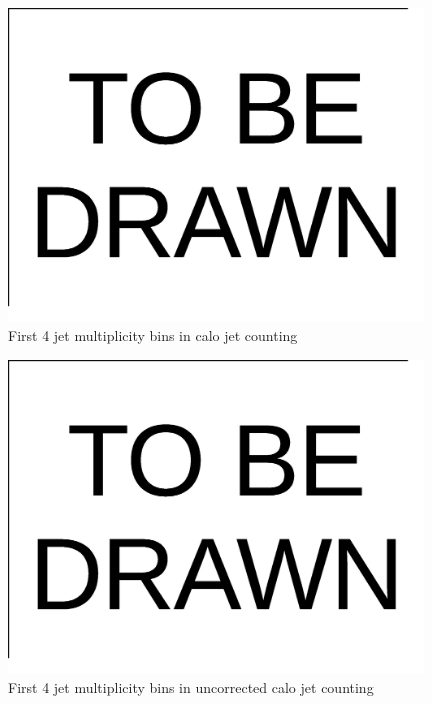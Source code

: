 \documentclass{cmspaper}
\begin{document}
\begin{figure}[hbtp]
   \begin{center} 
  \includegraphics[width=110mm]{TOBEDRAWN}
   \caption{First 4 jet multiplicity bins in calo jet counting}
   \label{Figure_CaloJetFit}
   \end{center}
\end{figure}

\begin{figure}[hbtp]
   \begin{center} 
  \includegraphics[width=110mm]{TOBEDRAWN}
   \caption{First 4 jet multiplicity bins in uncorrected calo jet counting}
   \label{Figure_UncorrectedCaloJetFit}
   \end{center}
\end{figure}
\end{document}
